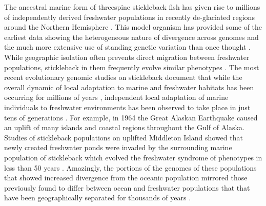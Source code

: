 \documentclass{article}
\begin{document}
The ancestral marine form of threespine stickleback fish has given rise to millions of independently derived freshwater populations in recently de-glaciated regions around the Northern Hemisphere 
\citep{Bell_1994, Thompson_1997, Cresko_2007}. 
This model organism has provided some of the earliest data showing the heterogeneous nature of divergence across genomes 
and the much more extensive use of standing genetic variation than once thought 
\citep{schluter2009genetics, Roesti_2014, Nelson_2018, Bassham_2018, Nelson_2019, Hohenlohe_2010, Terekhanova_2014, Marques_2016}.  
While geographic isolation often prevents direct migration between freshwater populations, stickleback in them frequently evolve similar phenotypes 
\citep{Cresko_2004, Colosimo_2004}. 
The most recent evolutionary genomic studies on stickleback document that while the overall dynamic of local adaptation to marine and freshwater habitats has been occurring for millions of years 
\citep{Nelson_2018}, independent local adaptation of marine individuals to freshwater environments has been observed to take place in just tens of generations \citep{Terekhanova_2014, Lescak2015evolution, Bassham_2018}. 
For example, in 1964 the Great Alaskan Earthquake caused an uplift of many islands and coastal regions throughout the Gulf of Alaska. 
Studies of stickleback populations on uplifted Middleton Island showed that newly created freshwater ponds were invaded by the surrounding marine population of stickleback which evolved the freshwater syndrome of phenotypes in less than 50 years 
\citep{Lescak2015evolution, Bassham_2018}. 
Amazingly, the portions of the genomes of these populations that showed increased divergence from the oceanic population
mirrored those previously found to differ between ocean and freshwater populations that
that have been geographically separated for thousands of years 
\citep{Hohenlohe_2010, Bassham_2018}. 
\end{document}
